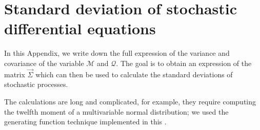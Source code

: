 \chapter[Standard deviation of SDEs]{Standard deviation of stochastic differential equations}
\label{app:std_sde}
In this Appendix, we write down the full expression of the variance and covariance of the variable \(\mathcal{M}\)
and \(\mathcal{Q}\). The goal is to obtain an expression of the matrix \(\vec{\Sigma}\) 
which can then be used to calculate the standard deviations of stochastic processes.

The calculations are long and complicated, for example, they require computing the twelfth moment of a multivariable normal distribution;
we used the generating function technique implemented in this .


